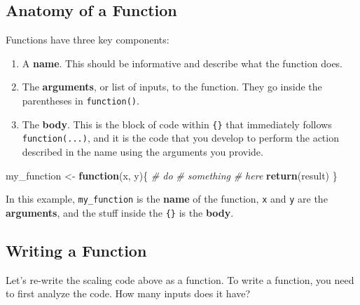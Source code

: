 \documentclass[
]{book}
\newenvironment{Shaded}{\begin{snugshade}}{\end{snugshade}}
\newcommand{\CommentTok}[1]{\textcolor[rgb]{0.56,0.35,0.01}{\textit{#1}}}
\newcommand{\ControlFlowTok}[1]{\textcolor[rgb]{0.13,0.29,0.53}{\textbf{#1}}}
\newcommand{\KeywordTok}[1]{\textcolor[rgb]{0.13,0.29,0.53}{\textbf{#1}}}
\newcommand{\NormalTok}[1]{#1}
\newcommand{\StringTok}[1]{\textcolor[rgb]{0.31,0.60,0.02}{#1}}
\begin{document}
\hypertarget{anatomy-of-a-function}{%
\subsection{Anatomy of a Function}\label{anatomy-of-a-function}}

Functions have three key components:

\begin{enumerate}
\def\labelenumi{\arabic{enumi}.}
\item
  A \textbf{name}. This should be informative and describe what the function does.
\item
  The \textbf{arguments}, or list of inputs, to the function. They go inside the parentheses in \texttt{function()}.
\item
  The \textbf{body}. This is the block of code within \texttt{\{\}} that immediately follows \texttt{function(...)}, and it is the code that you develop to perform the action described in the name using the arguments you provide.
\end{enumerate}

\begin{Shaded}
\begin{Highlighting}[]
\NormalTok{my_function <-}\StringTok{ }\ControlFlowTok{function}\NormalTok{(x, y)\{}
  \CommentTok{# do}
  \CommentTok{# something}
  \CommentTok{# here}
  \KeywordTok{return}\NormalTok{(result)}
\NormalTok{\}}
\end{Highlighting}
\end{Shaded}

In this example, \texttt{my\_function} is the \textbf{name} of the function, \texttt{x} and \texttt{y} are the \textbf{arguments}, and the stuff inside the \texttt{\{\}} is the \textbf{body}.

\hypertarget{writing-a-function}{%
\subsection{Writing a Function}\label{writing-a-function}}

Let's re-write the scaling code above as a function. To write a function, you need to first analyze the code. How many inputs does it have?
\end{document}
